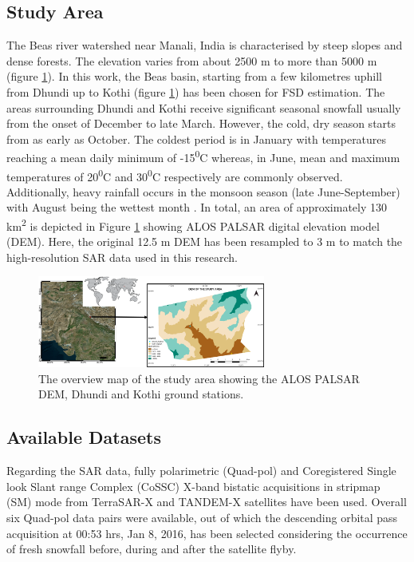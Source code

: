 \documentclass{article}
\begin{document}
\subsection{Study Area}
\label{ssec:area}
The Beas river watershed near Manali, India is characterised by steep slopes and dense forests. The elevation varies from about 2500 m to more than 5000 m (figure \ref{fig:overview}). In this work, the Beas basin, starting from a few kilometres uphill from Dhundi up to Kothi (figure \ref{fig:overview}) has been chosen for FSD estimation. The areas surrounding Dhundi and Kothi receive significant seasonal snowfall usually from the onset of December to late March. However, the cold, dry season starts from as early as October. The coldest period is in January with temperatures reaching a mean daily minimum of -15\textsuperscript{0}C whereas, in June, mean and maximum temperatures of 20\textsuperscript{0}C and 30\textsuperscript{0}C respectively are commonly observed. Additionally, heavy rainfall occurs in the monsoon season (late June-September) with August being the wettest month \cite{Thakur2012}. In total, an area of approximately 130 km\textsuperscript{2} is depicted in Figure \ref{fig:overview} showing ALOS PALSAR digital elevation model (DEM). Here, the original 12.5 m DEM has been resampled to 3 m to match the high-resolution SAR data used in this research. 

\begin{figure}[htb]
\centering
\includegraphics[width=7.5cm]{Overview.png}
\caption{The overview map of the study area showing the ALOS PALSAR DEM, Dhundi and Kothi ground stations.}
\label{fig:overview}
\end{figure}

\subsection{Available Datasets}
\label{ssec:data}
Regarding the SAR data, fully polarimetric (Quad-pol) and Coregistered Single look Slant range Complex (CoSSC) X-band bistatic acquisitions in stripmap (SM) mode from TerraSAR-X and TANDEM-X satellites have been used. Overall six Quad-pol data pairs were available, out of which the descending orbital pass acquisition at 00:53 hrs, Jan 8, 2016, has been selected considering the occurrence of fresh snowfall before, during and after the satellite flyby.
\end{document}

